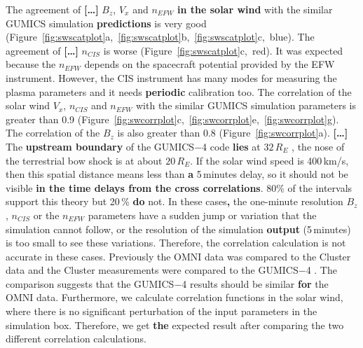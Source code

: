 \documentclass[linenumbers,draft]{agujournal}
\begin{document}
The agreement of \textbf{[\dots]} $B_{z}$, $V_{x}$ and $n_{EFW}$ \textbf{in the solar wind} with the similar GUMICS simulation \textbf{predictions} is very good (Figure~\ref{fig:swscatplot}a,~\ref{fig:swscatplot}b,~\ref{fig:swscatplot}c,~blue). The agreement of \textbf{[\dots]} $n_{CIS}$ is worse (Figure~\ref{fig:swscatplot}c,~red). It was expected because the $n_{EFW}$ depends on the spacecraft potential provided by the EFW instrument. However, the CIS instrument has many modes for measuring the plasma parameters and it needs \textbf{periodic} calibration too. The correlation of the solar wind $V_{x}$,  $n_{CIS}$ and $n_{EFW}$ with the similar GUMICS simulation parameters is greater than 0.9 (Figure~\ref{fig:swcorrplot}c,~\ref{fig:swcorrplot}e,~\ref{fig:swcorrplot}g). The correlation of the $B_{z}$ is also greater than 0.8 (Figure~\ref{fig:swcorrplot}a). \textbf{[\dots]} The \textbf{upstream boundary} of the GUMICS$-$4 code \textbf{lies} at $32\,R_E$ \citep{janhunen12:_gumic_mhd}, the nose of the terrestrial bow shock is at about $20\,R_E$. If the solar wind speed is 400\,km/s, then this spatial distance means less than \textbf{a} 5\,minutes delay, so it should not be visible \textbf{in the time delays from the cross correlations}. 80\% of the intervals support this theory but 20\,\% \textbf{do} not. In these cases\textbf{,} the one-minute resolution $B_z$, $n_{CIS}$ or the $n_{EFW}$ parameters have a sudden jump or variation that the simulation cannot follow, or the resolution of the simulation \textbf{output} (5\,minutes) is too small to see these variations. Therefore, the correlation calculation is not accurate in these cases. Previously the OMNI data was compared to the Cluster data and the Cluster measurements were compared to the GUMICS$-$4 \citep{facsko16:_one_earth}. The comparison suggests that the GUMICS$-$4 results should be similar \textbf{for} the OMNI data. Furthermore, we calculate correlation functions in the solar wind, where there is no significant perturbation of the input parameters in the simulation box. Therefore, we get \textbf{the} expected result after comparing the two different correlation calculations.
\end{document}

